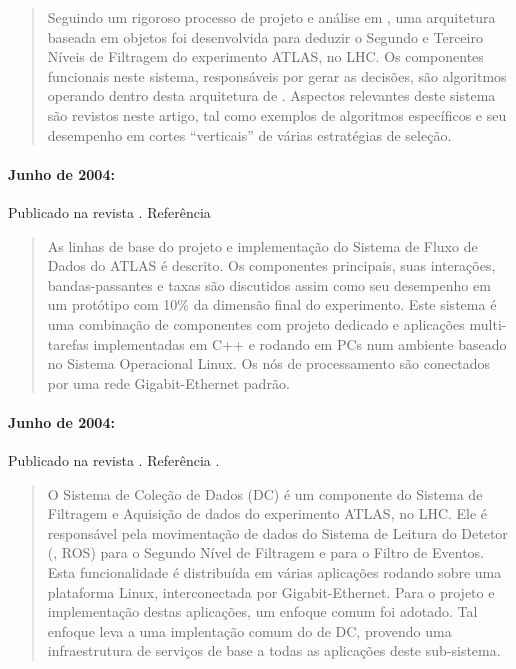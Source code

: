 \begin{quotation}
Seguindo um rigoroso processo de projeto e análise em , uma
arquitetura baseada em objetos foi desenvolvida para deduzir o Segundo e
Terceiro Níveis de Filtragem do experimento ATLAS, no LHC. Os componentes
funcionais neste sistema, responsáveis por gerar as decisões, são algoritmos
operando dentro desta arquitetura de . Aspectos relevantes deste
sistema são revistos neste artigo, tal como exemplos de algoritmos específicos
e seu desempenho em cortes ``verticais'' de várias estratégias de seleção.
\end{quotation}

\paragraph{Junho de 2004: } Publicado na revista . Referência~\cite{aa:tns-2004-3}

\begin{quotation}
As linhas de base do projeto e implementação do Sistema de Fluxo de Dados do
ATLAS é descrito. Os componentes principais, suas interações, bandas-passantes
e taxas são discutidos assim como seu desempenho em um protótipo com 10\% da
dimensão final do experimento. Este sistema é uma combinação de componentes
com projeto dedicado e aplicações multi-tarefas implementadas em C++ e rodando
em PCs num ambiente baseado no Sistema Operacional Linux. Os nós de
processamento são conectados por uma rede Gigabit-Ethernet padrão.
\end{quotation}

\paragraph{Junho de 2004: } Publicado
na revista . Referência
\cite{aa:tns-04-04}.

\begin{quotation}
O Sistema de Coleção de Dados (DC) é um componente do Sistema de Filtragem e
Aquisição de dados do experimento ATLAS, no LHC. Ele é responsável pela
movimentação de dados do Sistema de Leitura do Detetor (,
ROS) para o Segundo Nível de Filtragem e para o Filtro de Eventos. Esta
funcionalidade é distribuída em várias aplicações rodando sobre uma plataforma
Linux, interconectada por Gigabit-Ethernet. Para o projeto e implementação
destas aplicações, um enfoque comum foi adotado. Tal enfoque leva a uma
implentação comum do  de DC, provendo uma infraestrutura de
serviços de base a todas as aplicações deste sub-sistema.
\end{quotation}

